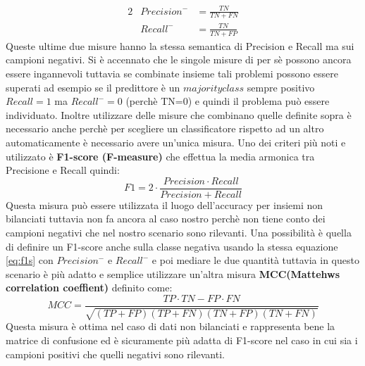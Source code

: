 \begin{alignat*}{2}
& Precision^{-} &= \frac{TN}{TN+FN}\\
& Recall^{-} &=  \frac{TN}{TN+FP}
\end{alignat*} 
Queste ultime due misure hanno la stessa semantica di Precision e Recall ma sui campioni negativi. Si è accennato che le singole misure di per sè possono ancora essere ingannevoli tuttavia se combinate insieme tali problemi possono essere superati ad esempio se il predittore è un $majority class$ sempre positivo $Recall=1$ ma  $Recall^{-}=0$ (perchè TN=0) e quindi il problema può essere individuato. Inoltre utilizzare delle misure che combinano quelle definite sopra è necessario anche perchè per scegliere un classificatore rispetto ad un altro automaticamente è necessario avere un'unica misura. Uno dei criteri più noti e utilizzato è \textbf{F1-score (F-measure)} che effettua la media armonica tra Precisione e Recall quindi:
\begin{equation*}
\label{eq:f1s}
F1 = 2 \cdot \frac{Precision \cdot Recall}{Precision + Recall}
\end{equation*}
Questa misura può essere utilizzata il luogo dell'accuracy per insiemi non bilanciati tuttavia non fa ancora al caso nostro perchè non tiene conto dei campioni negativi che nel nostro scenario sono rilevanti. Una possibilità è quella di definire un F1-score anche sulla classe negativa usando la stessa equazione \eqref{eq:f1s} con $Precision^{-}\text{ e } Recall^{-}$ e poi mediare le due quantità tuttavia in questo scenario è più adatto e semplice utilizzare un'altra misura \textbf{MCC(Mattehws correlation coeffient)} definito come:
\begin{equation*}
MCC = \frac{TP \cdot TN−FP \cdot FN}{\sqrt{(TP+FP)(TP+FN)(TN+FP)(TN+FN)}}
 \end{equation*}
 Questa misura è ottima nel caso di dati non bilanciati e rappresenta bene la matrice di confusione ed è sicuramente più adatta di F1-score nel caso in cui sia i campioni positivi che quelli negativi sono rilevanti.